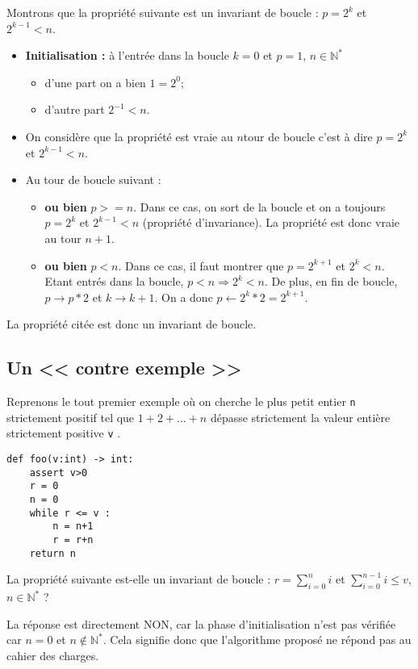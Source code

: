 Montrons que la propriété suivante est un invariant de boucle : $p=2^k$ et $2^{k-1}<n$.
\begin{itemize}
\item \textbf{Initialisation : }à l'entrée dans la boucle $k=0$ et $p=1$, $n\in\mathbb{N}^*$
\begin{itemize}
\item d'une part  on a bien $1=2^0$;
\item d'autre part $2^{-1}<n$.
\end{itemize}
\item On considère que la propriété est vraie au $n$\ieme tour de boucle c'est à dire $p=2^k$ et $2^{k-1}<n$.
\item Au tour de boucle suivant : 
\begin{itemize}
\item \textbf{ou bien} $p>=n$. Dans ce cas, on sort de la boucle et on a toujours $p=2^k$ et $2^{k-1}<n$ (propriété d'invariance). La propriété est donc vraie au tour $n+1$.
\item \textbf{ou bien} $p<n$. Dans ce cas, il faut montrer que  $p=2^{k+1}$ et $2^{k}<n$. Etant entrés dans la boucle, $p<n \Rightarrow 2^k<n$. De plus, en fin de boucle, $p\rightarrow p *2$ et $k\rightarrow k+1$. On a donc $p\leftarrow 2^k *2=2^{k+1}$. 
\end{itemize}
\end{itemize}
La propriété citée est donc un invariant de boucle. 

\subsection{Un << contre exemple >>}


Reprenons le tout premier exemple où on cherche le plus petit entier \texttt{n} strictement positif tel que $1 + 2 + . . . + n$ dépasse strictement la valeur entière strictement positive \texttt{v} .
\begin{lstlisting}
def foo(v:int) -> int:
    assert v>0
    r = 0
    n = 0
    while r <= v : 
        n = n+1
        r = r+n
    return n
\end{lstlisting}

La propriété suivante est-elle un invariant de boucle : 
$r=\sum\limits_{i=0}^n i$ et 
$\sum\limits_{i=0}^{n-1} i \leq v$, 
$n\in\mathbb{N}^*$ ?

La réponse est directement NON, car la phase d'initialisation n'est pas vérifiée car $n=0$ et $n\notin\mathbb{N}^*$.
Cela signifie donc que l'algorithme proposé ne répond pas au cahier des charges. 

